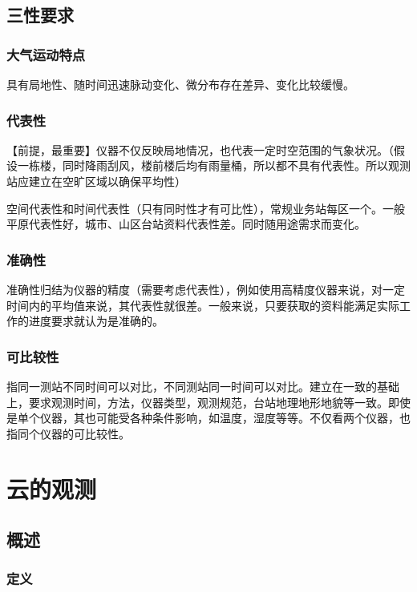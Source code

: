 \documentclass[UTF8,11pt]{ctexbook}
\begin{document}
\section{三性要求}

\subsection{大气运动特点}

具有局地性、随时间迅速脉动变化、微分布存在差异、变化比较缓慢。

\subsection{代表性}

【前提，最重要】仪器不仅反映局地情况，也代表一定时空范围的气象状况。（假设一栋楼，同时降雨刮风，楼前楼后均有雨量桶，所以都不具有代表性。所以观测站应建立在空旷区域以确保平均性）
		
空间代表性和时间代表性（只有同时性才有可比性），常规业务站每区一个。一般平原代表性好，城市、山区台站资料代表性差。同时随用途需求而变化。

\subsection{准确性}

准确性归结为仪器的精度（需要考虑代表性），例如使用高精度仪器来说，对一定时间内的平均值来说，其代表性就很差。一般来说，只要获取的资料能满足实际工作的进度要求就认为是准确的。

\subsection{可比较性}

指同一测站不同时间可以对比，不同测站同一时间可以对比。建立在一致的基础上，要求观测时间，方法，仪器类型，观测规范，台站地理地形地貌等一致。即使是单个仪器，其也可能受各种条件影响，如温度，湿度等等。不仅看两个仪器，也指同个仪器的可比较性。


\chapter{云的观测}

\section{概述}

\subsection{定义}
\end{document}

